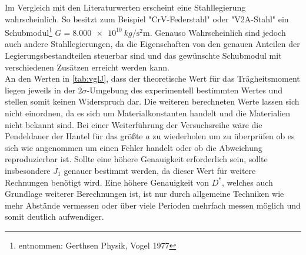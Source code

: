 Im Vergleich mit den Literaturwerten erscheint eine Stahllegierung wahrscheinlich. So besitzt zum Beispiel "CrV-Federstahl" oder "V2A-Stahl" ein Schubmodul\footnote{entnommen: Gerthsen Physik, Vogel 1977} $G=\SI{8.000 e10}{kg \per  \second \squared \metre}$.
Genauso Wahrscheinlich sind jedoch auch andere Stahllegierungen, da die Eigenschaften von den genauen Anteilen der Legierungsbestandteilen steuerbar sind und das gewünschte Schubmodul mit verschiedenen Zusätzen erreicht werden kann.\\
An den Werten in \cref{tab:vglJ}, dass der theoretische Wert für das Trägheitsmoment liegen jeweils in der $2 \sigma$-Umgebung des experimentell bestimmten Wertes und stellen somit keinen Widerspruch dar. Die weiteren berechneten Werte lassen sich nicht einordnen, da es sich um Materialkonstanten handelt und die Materialien nicht bekannt sind. Bei einer Weiterführung der Versuchsreihe wäre die Pendeldauer der Hantel für das größte $a$ zu wiederholen um zu überprüfen ob es sich wie angenommen um einen Fehler handelt oder ob die Abweichung reproduzierbar ist. Sollte eine höhere Genauigkeit erforderlich sein, sollte insbesondere $J_1$ genauer bestimmt werden, da dieser Wert für weitere Rechnungen benötigt wird. Eine höhere Genauigkeit von $D^*$, welches auch Grundlage weiterer Berechnungen ist, ist nur durch allgemeine Techniken wie mehr Abstände vermessen oder über viele Perioden mehrfach messen möglich und somit deutlich aufwendiger. 













